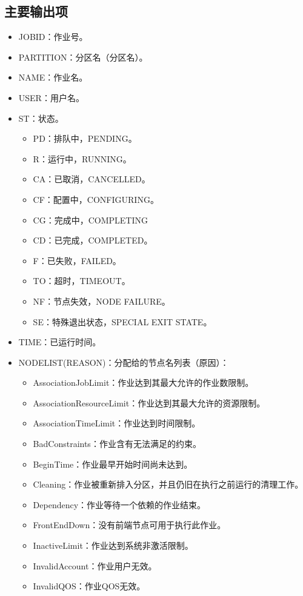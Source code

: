\subsection{主要输出项}
\begin{itemize}
	\item JOBID：作业号。
	\item PARTITION：分区名（分区名）。
	\item NAME：作业名。
	\item USER：用户名。
	\item ST：状态。
\begin{itemize}
	\item PD：排队中，PENDING。
	\item R：运行中，RUNNING。
	\item CA：已取消，CANCELLED。
	\item CF：配置中，CONFIGURING。
	\item CG：完成中，COMPLETING
	\item CD：已完成，COMPLETED。
	\item F：已失败，FAILED。
	\item TO：超时，TIMEOUT。
	\item NF：节点失效，NODE FAILURE。
	\item SE：特殊退出状态，SPECIAL EXIT STATE。
\end{itemize}
	\item TIME：已运行时间。
	\item NODELIST(REASON)：分配给的节点名列表（原因）：
\begin{itemize}
	\item AssociationJobLimit：作业达到其最大允许的作业数限制。
    \item AssociationResourceLimit：作业达到其最大允许的资源限制。
    \item AssociationTimeLimit：作业达到时间限制。
    \item BadConstraints：作业含有无法满足的约束。
    \item BeginTime：作业最早开始时间尚未达到。
    \item Cleaning：作业被重新排入分区，并且仍旧在执行之前运行的清理工作。
    \item Dependency：作业等待一个依赖的作业结束。
    \item FrontEndDown：没有前端节点可用于执行此作业。
    \item InactiveLimit：作业达到系统非激活限制。
    \item InvalidAccount：作业用户无效。
    \item InvalidQOS：作业QOS无效。

\end{itemize}
\end{itemize}
